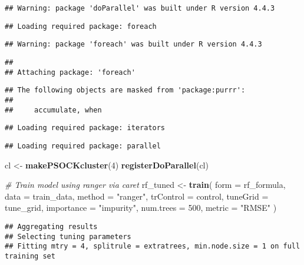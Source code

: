 \documentclass[
]{article}
\newenvironment{Shaded}{\begin{snugshade}}{\end{snugshade}}
\newcommand{\AttributeTok}[1]{\textcolor[rgb]{0.13,0.29,0.53}{#1}}
\newcommand{\CommentTok}[1]{\textcolor[rgb]{0.56,0.35,0.01}{\textit{#1}}}
\newcommand{\DecValTok}[1]{\textcolor[rgb]{0.00,0.00,0.81}{#1}}
\newcommand{\FunctionTok}[1]{\textcolor[rgb]{0.13,0.29,0.53}{\textbf{#1}}}
\newcommand{\NormalTok}[1]{#1}
\newcommand{\OtherTok}[1]{\textcolor[rgb]{0.56,0.35,0.01}{#1}}
\newcommand{\StringTok}[1]{\textcolor[rgb]{0.31,0.60,0.02}{#1}}
\begin{document}
\begin{verbatim}
## Warning: package 'doParallel' was built under R version 4.4.3
\end{verbatim}

\begin{verbatim}
## Loading required package: foreach
\end{verbatim}

\begin{verbatim}
## Warning: package 'foreach' was built under R version 4.4.3
\end{verbatim}

\begin{verbatim}
## 
## Attaching package: 'foreach'
\end{verbatim}

\begin{verbatim}
## The following objects are masked from 'package:purrr':
## 
##     accumulate, when
\end{verbatim}

\begin{verbatim}
## Loading required package: iterators
\end{verbatim}

\begin{verbatim}
## Loading required package: parallel
\end{verbatim}

\begin{Shaded}
\begin{Highlighting}[]
\NormalTok{cl }\OtherTok{\textless{}{-}} \FunctionTok{makePSOCKcluster}\NormalTok{(}\DecValTok{4}\NormalTok{)}
\FunctionTok{registerDoParallel}\NormalTok{(cl)}

\CommentTok{\#  Train model using ranger via caret}
\NormalTok{rf\_tuned }\OtherTok{\textless{}{-}} \FunctionTok{train}\NormalTok{(}
  \AttributeTok{form =}\NormalTok{ rf\_formula,}
  \AttributeTok{data =}\NormalTok{ train\_data,}
  \AttributeTok{method =} \StringTok{"ranger"}\NormalTok{,}
  \AttributeTok{trControl =}\NormalTok{ control,}
  \AttributeTok{tuneGrid =}\NormalTok{ tune\_grid,}
  \AttributeTok{importance =} \StringTok{"impurity"}\NormalTok{,}
  \AttributeTok{num.trees =} \DecValTok{500}\NormalTok{,}
  \AttributeTok{metric =} \StringTok{"RMSE"}
\NormalTok{)}
\end{Highlighting}
\end{Shaded}

\begin{verbatim}
## Aggregating results
## Selecting tuning parameters
## Fitting mtry = 4, splitrule = extratrees, min.node.size = 1 on full training set
\end{verbatim}
\end{document}
